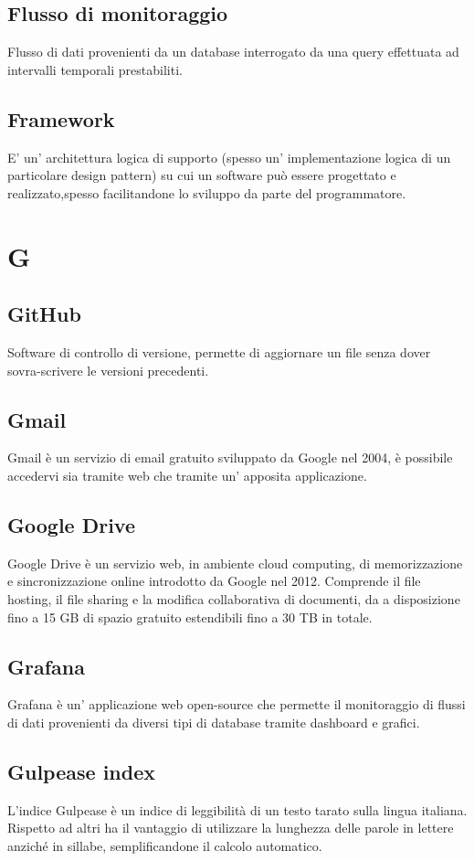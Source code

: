     \subsection*{Flusso di monitoraggio}
Flusso di dati provenienti da un database interrogato da una query effettuata ad intervalli temporali prestabiliti.
    \subsection*{Framework}
E’ un’ architettura logica di supporto (spesso un’ implementazione logica di un particolare design pattern) su cui un software può essere progettato e realizzato,spesso facilitandone lo sviluppo da parte del programmatore.
\newpage
    
\section{G}
    \subsection*{GitHub}
Software di controllo di versione, permette di aggiornare un file senza dover sovra-scrivere le versioni precedenti.
    \subsection*{Gmail}
Gmail è un servizio di email gratuito sviluppato da Google nel 2004, è possibile accedervi sia tramite web che tramite un’ apposita applicazione.
    \subsection*{Google Drive}
Google Drive è un servizio web, in ambiente cloud computing, di memorizzazione e sincronizzazione online introdotto da Google nel 2012. Comprende il file hosting, il file sharing e la modifica collaborativa di documenti, da a disposizione fino a 15 GB di spazio gratuito estendibili fino a 30 TB in totale.
    \subsection*{Grafana}
Grafana è un’ applicazione web open-source che permette il monitoraggio di flussi di dati provenienti da diversi tipi di database tramite dashboard e grafici.
    \subsection*{Gulpease index}
L’indice Gulpease è un indice di leggibilità di un testo tarato sulla lingua italiana.  Rispetto ad altri ha il vantaggio di utilizzare la lunghezza delle parole in lettere anziché in sillabe, semplificandone il calcolo automatico.
